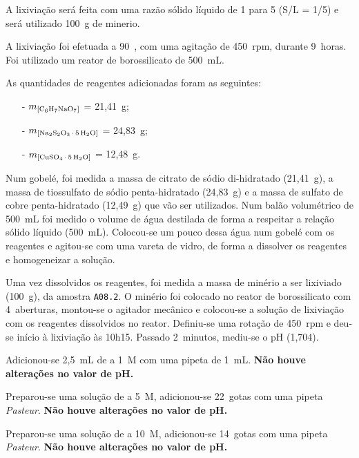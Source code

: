 A lixiviação será feita com uma razão sólido líquido de 1 para 5 (S/L = 1/5) e será utilizado 100~g de minerio.

A lixiviação foi efetuada a 90~\graus{}, com uma agitação de 450~rpm, durante 9~horas.
Foi utilizado um reator de borossilicato de 500~mL.

As quantidades de reagentes adicionadas foram as seguintes:
\begin{itemize}
    \item[-] $m_{\left[\citratodi{}\right]}$ = 21,41~g;
    \item[-] $m_{\left[\tsp{}\right]}$ = 24,83~g;
    \item[-] $m_{\left[\sulfcu{}\right]}$ = 12,48~g.
\end{itemize}

Num gobelé, foi medida a massa de citrato de sódio di-hidratado (21,41~g), a massa de tiossulfato de sódio penta-hidratado (24,83~g) e a massa de sulfato de cobre penta-hidratado (12,49~g) que vão ser utilizados.
Num balão volumétrico de 500~mL foi medido o volume de água destilada de forma a respeitar a relação sólido líquido (500~mL).
Colocou-se um pouco dessa água num gobelé com os reagentes e agitou-se com uma vareta de vidro, de forma a dissolver os reagentes e homogeneizar a solução.

Uma vez dissolvidos os reagentes, foi medida a massa de minério a ser lixiviado (100~g), da amostra \texttt{A08.2}.
O minério foi colocado no reator de borossilicato com 4~aberturas, montou-se o agitador mecânico e colocou-se a solução de lixiviação com os reagentes dissolvidos no reator.
Definiu-se uma rotação de 450~rpm e deu-se início à lixiviação às 10h15.
Passado 2~minutos, mediu-se o pH (1,704).

Adicionou-se 2,5~mL de \hidso{} a 1~M com uma pipeta de 1~mL. 
\textbf{Não houve alterações no valor de pH.}


Preparou-se uma solução de \hidso{} a 5~M, adicionou-se 22~gotas com uma pipeta \emph{Pasteur}.
\textbf{Não houve alterações no valor de pH.}

Preparou-se uma solução de \hidso{} a 10~M, adicionou-se 14~gotas com uma pipeta \emph{Pasteur}.
\textbf{Não houve alterações no valor de pH.}

